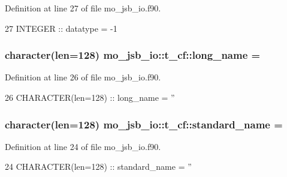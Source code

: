 Definition at line 27 of file mo\+\_\+jsb\+\_\+io.\+f90.


\begin{DoxyCode}
27     \textcolor{keywordtype}{INTEGER}            :: datatype      = -1
\end{DoxyCode}
\hypertarget{structmo__jsb__io_1_1t__cf_a9742db1ca93aa98e36b5cfde04e98ac1}{}
\subsubsection[{long\+\_\+name}]{\setlength{\rightskip}{0pt plus 5cm}character(len=128) mo\+\_\+jsb\+\_\+io\+::t\+\_\+cf\+::long\+\_\+name = \textquotesingle{}\textquotesingle{}}\label{structmo__jsb__io_1_1t__cf_a9742db1ca93aa98e36b5cfde04e98ac1}


Definition at line 26 of file mo\+\_\+jsb\+\_\+io.\+f90.


\begin{DoxyCode}
26     \textcolor{keywordtype}{CHARACTER(len=128)} :: long\_name     = \textcolor{stringliteral}{''}
\end{DoxyCode}
\hypertarget{structmo__jsb__io_1_1t__cf_a8a9da11d2bd4d2f543e06a246c2c114a}{}
\subsubsection[{standard\+\_\+name}]{\setlength{\rightskip}{0pt plus 5cm}character(len=128) mo\+\_\+jsb\+\_\+io\+::t\+\_\+cf\+::standard\+\_\+name = \textquotesingle{}\textquotesingle{}}\label{structmo__jsb__io_1_1t__cf_a8a9da11d2bd4d2f543e06a246c2c114a}


Definition at line 24 of file mo\+\_\+jsb\+\_\+io.\+f90.


\begin{DoxyCode}
24     \textcolor{keywordtype}{CHARACTER(len=128)} :: standard\_name = \textcolor{stringliteral}{''}
\end{DoxyCode}
\hypertarget{structmo__jsb__io_1_1t__cf_a1cfa1074fe607dc5208584dbbc88bf0f}{}
